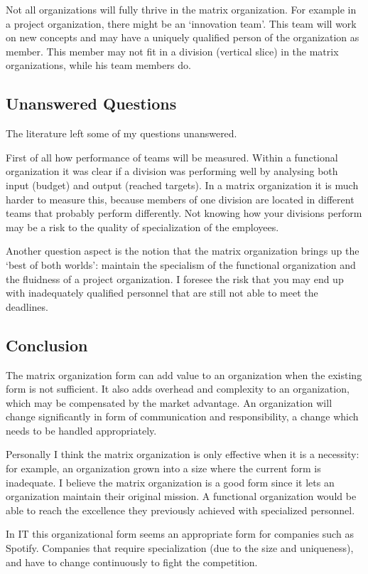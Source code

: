 Not all organizations will fully thrive in the matrix organization. For example in a project organization, there might be an `innovation team'. This team will work on new concepts and may have a uniquely qualified person of the organization as member. This member may not fit in a division (vertical slice) in the matrix organizations, while his team members do.

\subsection*{Unanswered Questions}
The literature left some of my questions unanswered.

First of all how performance of teams will be measured. Within a functional organization it was clear if a division was performing well by analysing both input (budget) and output (reached targets). In a matrix organization it is much harder to measure this, because members of one division are located in different teams that probably perform differently. Not knowing how your divisions perform may be a risk to the quality of specialization of the employees.

Another question aspect is the notion that the matrix organization brings up the `best of both worlds': maintain the specialism of the functional organization and the fluidness of a project organization. I foresee the risk that you may end up with inadequately qualified personnel that are still not able to meet the deadlines.

\subsection*{Conclusion}
The matrix organization form can add value to an organization when the existing form is not sufficient. It also adds overhead and complexity to an organization, which may be compensated by the market advantage. An organization will change significantly in form of communication and responsibility, a change which needs to be handled appropriately.

Personally I think the matrix organization is only effective when it is a necessity: for example, an organization grown into a size where the current form is inadequate. I believe the matrix organization is a good form since it lets an organization maintain their original mission. A functional organization would be able to reach the excellence they previously achieved with specialized personnel.

In IT this organizational form seems an appropriate form for companies such as Spotify. Companies that require specialization (due to the size and uniqueness), and have to change continuously to fight the competition.